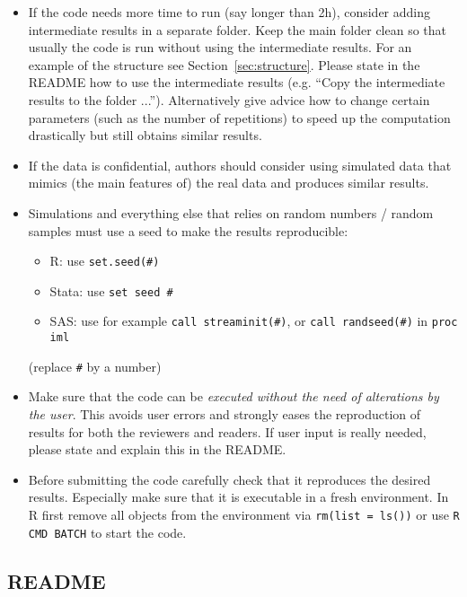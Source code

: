 \documentclass[12pt,a4paper]{article}
\begin{document}
\begin{itemize}
\begin{itemize}
\end{itemize}
\item If the code needs more time to run (say longer than 2h), consider adding
  intermediate results in a separate folder. Keep the main folder clean so that
  usually the code is run without using the intermediate results. For an example
  of the structure see Section~\ref{sec:structure}. Please state in the README
  how to use the intermediate results (e.g. ``Copy the intermediate results to
  the folder ...''). Alternatively give advice how to change certain parameters
  (such as the number of repetitions) to speed up the computation drastically
  but still obtains similar results.
\item If the data is confidential, authors should consider using simulated data
  that mimics (the main features of) the real data and produces similar results.
\item Simulations and everything else that relies on random numbers / random
  samples {must} use a seed to make the results reproducible:
  \begin{itemize}
  \item \textsf{R}: use \texttt{set.seed(\#)}
  \item \textsf{Stata}: use \texttt{set seed \#}
  \item \textsf{SAS}: use for example \texttt{call streaminit(\#)}, or
    \texttt{call randseed(\#)} in \texttt{proc iml}
  \end{itemize}
  (replace \texttt{\#} by a number)
\item Make sure that the code can be \emph{executed without the need of
    alterations by the user}. This avoids user errors and strongly eases the
  reproduction of results for both the reviewers and readers. If user input is
  really needed, please state and explain this in the README.
\item Before submitting the code carefully check that it reproduces the desired
  results. Especially make sure that it is executable in a fresh environment. In
  \textsf{R} first remove all objects from the environment via \texttt{rm(list =
    ls())} or use \texttt{R CMD BATCH} to start the code.
\end{itemize}

\subsection{README}
\end{document}
